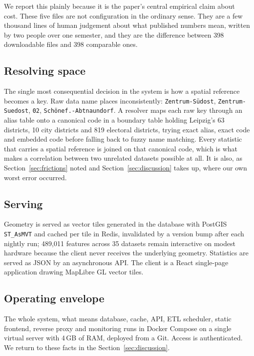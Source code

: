 \documentclass[conference,a4paper]{IEEEtran}
\begin{document}
We report this plainly because it is the paper's central empirical claim about
cost. These five files are not configuration in the ordinary sense. They are a
few thousand lines of human judgement about what published numbers mean, written
by two people over one semester, and they are the difference between 398
downloadable files and 398 comparable ones.

\subsection{Resolving space}
The single most consequential decision in the system is how a spatial reference
becomes a key. Raw data name places inconsistently: \texttt{Zentrum-Südost},
\texttt{Zentrum-Suedost}, \texttt{02}, \texttt{Schönef.-Abtnaundorf}. A resolver
maps each raw key through an alias table onto a canonical code in a boundary
table holding Leipzig's 63 districts, 10 city districts and 819 electoral
districts, trying exact alias, exact code and embedded code before falling back
to fuzzy name matching. Every statistic that carries a spatial reference is
joined on that canonical code, which is what makes a correlation between two
unrelated datasets possible at all. It is also, as Section~\ref{sec:frictions} noted and
Section~\ref{sec:discussion} takes up, where our own worst error occurred.

\subsection{Serving}
Geometry is served as vector tiles generated in the database with PostGIS
\texttt{ST\_AsMVT} and cached per tile in Redis, invalidated by a version bump
after each nightly run; 489{,}011 features across 35 datasets remain
interactive on modest hardware because the client never receives the underlying
geometry. Statistics are served as JSON by an asynchronous API. The client is a
React single-page application drawing MapLibre GL vector tiles.

\subsection{Operating envelope}
The whole system, what means database, cache, API, ETL scheduler, static frontend,
reverse proxy and monitoring runs in Docker Compose on a single virtual
server with 4\,GB of RAM, deployed from a Git. Access is authenticated. We
return to these facts in the Section~\ref{sec:discussion}.
\end{document}
